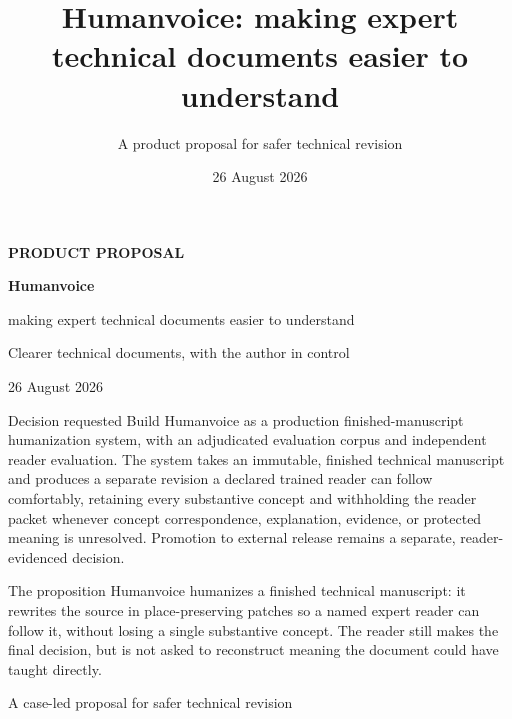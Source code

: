 \documentclass[12pt,a4paper,openany]{report}
\title{Humanvoice: making expert technical documents easier to understand}
\author{A product proposal for safer technical revision}
\date{26 August 2026}
\begin{document}
\hypersetup{pageanchor=false}
\begin{titlepage}
\thispagestyle{empty}
\vspace*{0.55in}
{\sffamily\bfseries\color{hvgold}\large PRODUCT PROPOSAL\par}
\vspace{0.26in}
{\sffamily\bfseries\color{hvnavy}\fontsize{29}{35}\selectfont Humanvoice\par}
\vspace{0.08in}
{\sffamily\color{hvocean}\fontsize{21}{26}\selectfont
making expert technical documents easier to understand\par}
\vspace{0.32in}
{\large Clearer technical documents, with the author in control\par}
\vspace{0.12in}
 {\color{hvslate}26 August 2026\par}
\vfill
\begin{decisionbox}{Decision requested}
Build Humanvoice as a production finished-manuscript humanization system, with
an adjudicated evaluation corpus and independent reader evaluation. The system
takes an immutable, finished technical manuscript and produces a separate
revision a declared trained reader can follow comfortably, retaining every
substantive concept and withholding the reader packet whenever concept
correspondence, explanation, evidence, or protected meaning is unresolved.
Promotion to external release remains a separate, reader-evidenced decision.
\end{decisionbox}
\vspace{0.18in}
\begin{takeawaybox}{The proposition}
Humanvoice humanizes a finished technical manuscript: it rewrites the source in
place-preserving patches so a named expert reader can follow it, without losing
a single substantive concept. The reader still makes the final decision, but is
not asked to reconstruct meaning the document could have taught directly.
\end{takeawaybox}
\vfill
{\sffamily\color{hvslate}A case-led proposal for safer technical revision\par}
\end{titlepage}
\end{document}
